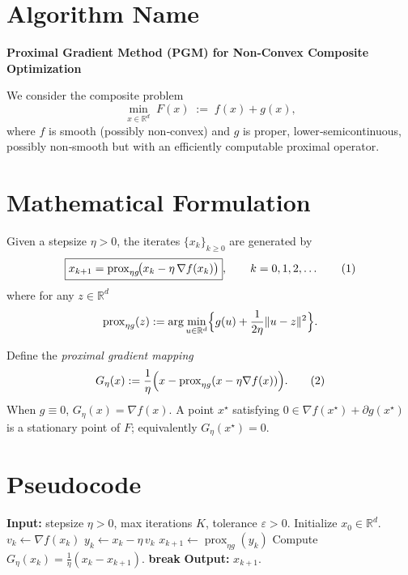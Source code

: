 \documentclass{article}
\newcommand{\prox}{\operatorname{prox}}
\newcommand{\grad}{\nabla}
\newcommand{\R}{\mathbb{R}}
\begin{document}
\section*{Algorithm Name}
\textbf{Proximal Gradient Method (PGM) for Non‑Convex Composite Optimization}  

We consider the composite problem  
\[
\min_{x\in\R^{d}} \; F(x)\;:=\; f(x)+g(x),
\]
where $f$ is smooth (possibly non‑convex) and $g$ is proper, lower‑semicontinuous, possibly non‑smooth but with an efficiently computable proximal operator.

\section*{Mathematical Formulation}
Given a stepsize $\eta>0$, the iterates $\{x_k\}_{k\ge 0}$ are generated by  
\begin{equation}
\boxed{%
x_{k+1}= \prox_{\eta g}\!\bigl(x_k-\eta\,\grad f(x_k)\bigr)},
\qquad k=0,1,2,\dots
\tag{1}
\end{equation}
where for any $z\in\R^{d}$  
\[
\prox_{\eta g}(z):=\arg\min_{u\in\R^{d}}\Bigl\{ g(u)+\frac{1}{2\eta}\|u-z\|^{2}\Bigr\}.
\]

Define the \emph{proximal gradient mapping}
\[
G_{\eta}(x):=\frac{1}{\eta}\Bigl(x-\prox_{\eta g}(x-\eta\grad f(x))\Bigr).
\tag{2}
\]
When $g\equiv0$, $G_{\eta}(x)=\grad f(x)$. A point $x^{\star}$ satisfying $0\in\grad f(x^{\star})+\partial g(x^{\star})$ is a stationary point of $F$; equivalently $G_{\eta}(x^{\star})=0$.

\section*{Pseudocode}
\begin{algorithm}[H]
\caption{Proximal Gradient Method}
\begin{algorithmic}[1]
\State \textbf{Input:} stepsize $\eta>0$, max iterations $K$, tolerance $\varepsilon>0$.
\State Initialize $x_{0}\in\R^{d}$.
    \State $v_k \gets \grad f(x_k)$                     
    \State $y_k \gets x_k - \eta\, v_k$                
    \State $x_{k+1} \gets \prox_{\eta g}(y_k)$         
    \State Compute $G_{\eta}(x_k)=\frac{1}{\eta}(x_k-x_{k+1})$.
        \State \textbf{break}
    \EndIf
\EndFor
\State \textbf{Output:} $x_{k+1}$.
\end{algorithmic}
\end{algorithm}
\end{document}
